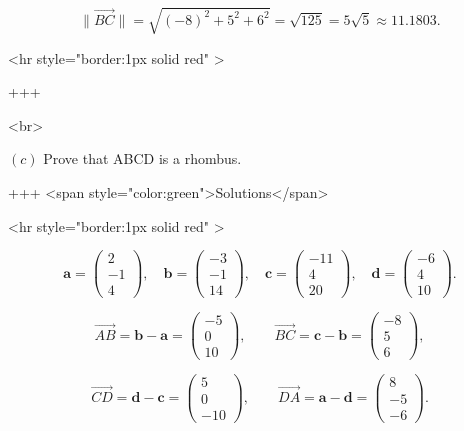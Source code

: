 $$
\lVert \overrightarrow{BC}\rVert
= \sqrt{(-8)^2+5^2+6^2}
= \sqrt{125}
= 5\sqrt{5}
\approx 11.1803.
$$

<hr style="border:1px solid red" >

+++

<br>

\((c)\) Prove that ABCD is a rhombus.

+++ <span style="color:green">Solutions</span>

<hr style="border:1px solid red" >

$$
\mathbf{a}=\left(\begin{array}{c}2\\-1\\4\end{array}\right),\quad
\mathbf{b}=\left(\begin{array}{c}-3\\-1\\14\end{array}\right),\quad
\mathbf{c}=\left(\begin{array}{c}-11\\4\\20\end{array}\right),\quad
\mathbf{d}=\left(\begin{array}{c}-6\\4\\10\end{array}\right).
$$

$$
\overrightarrow{AB}=\mathbf{b}-\mathbf{a}=\left(\begin{array}{c}-5\\0\\10\end{array}\right),\qquad
\overrightarrow{BC}=\mathbf{c}-\mathbf{b}=\left(\begin{array}{c}-8\\5\\6\end{array}\right),
$$

$$
\overrightarrow{CD}=\mathbf{d}-\mathbf{c}=\left(\begin{array}{c}5\\0\\-10\end{array}\right),\qquad
\overrightarrow{DA}=\mathbf{a}-\mathbf{d}=\left(\begin{array}{c}8\\-5\\-6\end{array}\right).
$$

